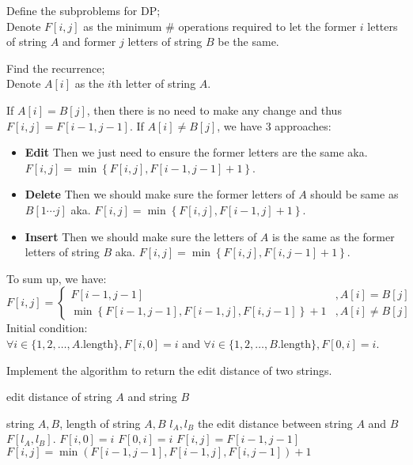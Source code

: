 \documentclass[11pt]{article}
\begin{document}
\begin{qparts}
\item Define the subproblems for DP;\\
Denote $F[i,j]$ as the minimum \# operations required to let the former $i$ letters of string $A$ and former $j$ letters of string $B$ be the same.

\item Find the recurrence;\\
Denote $A[i]$ as the $i$th letter of string $A$.

If $A[i]=B[j]$, then there is no need to make any change and thus $F[i,j]=F[i-1,j-1]$.
If $A[i]\neq B[j]$, we have 3 approaches:
\begin{itemize}
    
    \item \textbf{Edit} Then we just need to ensure the former letters are the same aka. $F[i,j]=\min \left\{ F[i,j],F[i-1,j-1]+1 \right\} $.
    \item \textbf{Delete} Then we should make sure the former letters of $A$ should be same as $B[1\cdots j]$ aka. $F[i,j]=\min \left\{ F[i,j],F[i-1,j]+1 \right\} $.
    \item \textbf{Insert} Then we should make sure the letters of $A$ is the same as the former letters of string $B$ aka. $F[i,j]=\min \left\{ F[i,j],F[i,j-1]+1 \right\} $.
\end{itemize}
To sum up, we have:
$$
F[i,j]=
\begin{cases}
    F[i-1,j-1]&,A[i]=B[j]\\
    \min \left\{ F[i-1,j-1],F[i-1,j],F[i,j-1] \right\}+1&,A[i]\neq B[j] 
\end{cases}
$$
Initial condition: \\
$\forall i \in \{ 1,2, \ldots ,A.\text{length}\},F[i,0]=i$ and $\forall i \in \{ 1,2, \ldots ,B.\text{length} \},F[0,i]=i$.

\item Implement the algorithm to return the edit distance of two strings.
\begin{algorithm}
    \caption{edit distance of string $A$ and string $B$}
    \begin{algorithmic}
        \Require string $A,B$, length of string $A,B$ $l_{A},l_{B}$
        \Ensure the edit distance between string $A$ and $B$ $F[l_{A},l_{B}]$.
        \State $F[i,0]=i$
        \EndFor
        \State $F[0,i]=i$
        \EndFor
        \State $F[i,j]=F[i-1,j-1]$
        \Else
        \State $F[i,j]=\min \left( F[i-1,j-1],F[i-1,j],F[i,j-1] \right) +1$
        \EndIf
        \EndFor
        \EndFor
    \end{algorithmic}
\end{algorithm}

\end{qparts}
\end{document}
